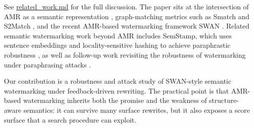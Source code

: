See \href{related_work.md}{related\_work.md} for the full discussion. The paper sits at the intersection of AMR as a semantic representation \cite{banarescu-etal-2013-amr}, graph-matching metrics such as Smatch \cite{cai-knight-2013-smatch} and S2Match \cite{opitz-etal-2020-amr}, and the recent AMR-based watermarking framework SWAN \cite{ye-etal-2026-swan}. Related semantic watermarking work beyond AMR includes SemStamp, which uses sentence embeddings and locality-sensitive hashing to achieve paraphrastic robustness \cite{hou-etal-2024-semstamp}, as well as follow-up work revisiting the robustness of watermarking under paraphrasing attacks \cite{rastogi-pruthi-2024-paraphrasing}.

Our contribution is a robustness and attack study of SWAN-style semantic watermarking under feedback-driven rewriting. The practical point is that AMR-based watermarking inherits both the promise and the weakness of structure-aware semantics: it can survive many surface rewrites, but it also exposes a score surface that a search procedure can exploit.
